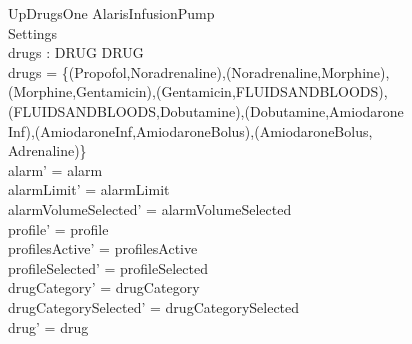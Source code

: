 \begin{schema}{UpDrugsOne}
	\Delta AlarisInfusionPump\\
	 Settings\\
	drugs : DRUG \rel DRUG\\
	\where
	drugs = \{(Propofol,Noradrenaline),(Noradrenaline,Morphine),\\
	(Morphine,Gentamicin),(Gentamicin,FLUIDSANDBLOODS),\\
	(FLUIDSANDBLOODS,Dobutamine),(Dobutamine,Amiodarone\\
	Inf),(AmiodaroneInf,AmiodaroneBolus),(AmiodaroneBolus,\\
	Adrenaline)\}\\
	alarm' = alarm\\
	alarmLimit' = alarmLimit\\
	alarmVolumeSelected' = alarmVolumeSelected\\
	profile' = profile\\
	profilesActive' = profilesActive\\  
	  profileSelected' = profileSelected\\
	drugCategory' = drugCategory\\ drugCategorySelected' = drugCategorySelected\\
	drug' = drug\\ 
	 

\end{schema}
